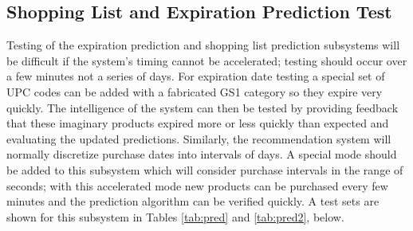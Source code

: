 \documentclass[11pt,letterpaper]{article}
\begin{document}
\clearpage

\subsection{Shopping List and Expiration Prediction Test}
Testing of the expiration prediction and shopping list prediction subsystems will be difficult if the system's timing cannot be accelerated; testing should occur over a few minutes not a series of days. For expiration date testing a special set of UPC codes can be added with a fabricated GS1 category so they expire very quickly. The intelligence of the system can then be tested by providing feedback that these imaginary products expired more or less quickly than expected and evaluating the updated predictions. Similarly, the recommendation system will normally discretize purchase dates into intervals of days. A special mode should be added to this subsystem which will consider purchase intervals in the range of seconds; with this accelerated mode new products can be purchased every few minutes and the prediction algorithm can be verified quickly. A test sets are shown for this subsystem in Tables \ref{tab:pred} and \ref{tab:pred2}, below.
\end{document}
